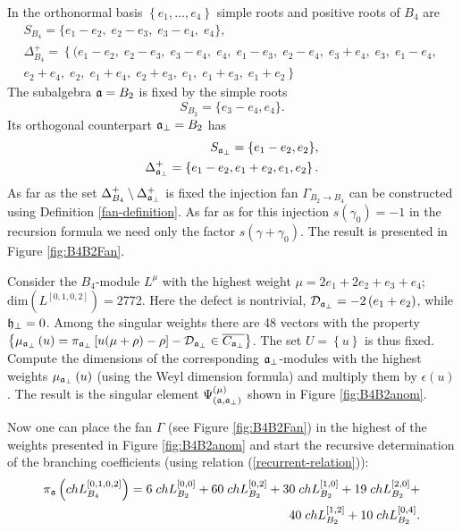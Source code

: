 In the orthonormal basis $\left\{e_1,\dots,e_4\right\}$ simple roots and positive roots of $B_4$ are
\begin{eqnarray*}
  \label{eq:19}
  S_{B_4}= \{e_1 - e_2,\; e_2 - e_3,\; e_3 - e_4,\; e_4\},\\[2mm]
 \Delta^+_{B_4}=\left\{ (e_1 - e_2,\; e_2 - e_3,\; e_3 - e_4,\; e_4,\; e_1 - e_3,\; e_2 - e_4,\; e_3 + e_4,\; e_3,\; e_1 - e_4,\;\right.\\
 \left. e_2 + e_4,\; e_2,\; e_1 + e_4,\; e_2 + e_3,\; e_1,\; e_1 + e_3,\; e_1 + e_2\right\}
\end{eqnarray*}
The subalgebra $\mathfrak{a}=B_2$ is fixed by the simple roots
\begin{equation*}
  \label{eq:26}
 S_{B_2}=\{e_3-e_4,e_4\}.
\end{equation*}
Its orthogonal counterpart $\mathfrak{a}_{\bot}=B_2$ has
\begin{eqnarray*}
  \label{eq:27}
  S_{\mathfrak{a}_{\bot}}=\{e_1-e_2,e_2\},\\
 \Delta^{+}_{\mathfrak{a}_{\bot}}= \left\{e_1-e_2,e_1+e_2,e_1,e_2\right\}.
\end{eqnarray*}
As far as the set $\Delta^+_{B_4} \setminus  \Delta^{+}_{\mathfrak{a}_{\bot}}$ is fixed the injection
fan $\Gamma_{B_2 \to B_4}$ can be constructed using Definition \ref{fan-definition}.
As far as for this injection $s\left( \gamma_0\right)=-1$ in the recursion formula we need only the factor
 $s\left(\gamma + \gamma_0\right)$.
The result is presented in Figure \ref{fig:B4B2Fan}.


Consider the $B_4$-module $L^{\mu}$ with the highest weight $\mu=2e_1 + 2 e_2 + e_3 + e_4$; \,
$\mathrm{dim}(L^{\left[0,1,0,2\right]})=2772$.
Here the defect is nontrivial, $\mathcal{D}_{\mathfrak{a}_{\perp }}=-2\left( e_1 + e_2 \right)$,
while $\mathfrak{h}_{\bot}=0$. Among the singular weights there are
48 vectors with the property $\left\{ \mu _{\af_{\perp }%
}\left( u\right) =\pi _{\af_{\perp }}\left[ u(\mu +\rho
)-\rho \right] -\mathcal{D}_{\af_{\perp }}\in \overline{C_{\af_{\perp }}}\right\} $.
The set $U=\left\{ u \right\}$ is thus fixed.
Compute the dimensions of the corresponding $\mathfrak{a}_{\bot}$-modules with the highest weights
$ \mu _{\mathfrak{a}_{\perp }}\left( u\right)$ (using the Weyl dimension formula) and multiply them
by $\epsilon\left( u \right)$. The result is the singular element
$\Psi ^{\left( \mu \right) }_{\left(  \mathfrak{a}, \mathfrak{a}_{\bot} \right)}$ shown in Figure \ref{fig:B4B2anom}.

Now one can place the fan $\Gamma$ (see Figure \ref{fig:B4B2Fan}) in the highest of the weights
presented in Figure \ref{fig:B4B2anom} and start the recursive determination of the branching coefficients
(using relation (\ref{recurrent-relation})):
\begin{eqnarray*}
  \label{eq:24}
  \pi_{\mathfrak{a}} \left(ch L^{\left[0,1,0,2\right]}_{B_4}\right) = 6 \; ch L^{\left[0,0\right]}_{B_2}+ 60
  \; ch L_{B_2}^{\left[0,2\right]}+ 30 \; ch L_{B_2}^{\left[1,0\right]}+ 19 \; ch L_{B_2}^{\left[2,0\right]}+\\
  40 \; ch L_{B_2}^{\left[1,2\right]}+ 10 \; ch L_{B_2}^{\left[0,4\right]}.
\end{eqnarray*}

